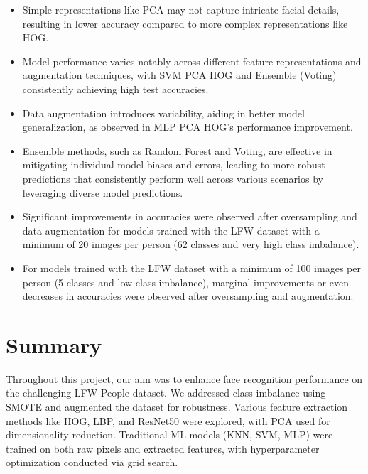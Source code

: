 \documentclass[a4paper]{article}
\theoremstyle{plain}
\theoremstyle{definition}
\begin{document}
\begin{itemize}

    \item Simple representations like PCA may not capture intricate facial details, resulting in lower accuracy compared to more complex representations like HOG.
    
    \item Model performance varies notably across different feature representations and augmentation techniques, with SVM PCA HOG and Ensemble (Voting) consistently achieving high test accuracies.
    
    \item Data augmentation introduces variability, aiding in better model generalization, as observed in MLP PCA HOG's performance improvement.
    
    \item Ensemble methods, such as Random Forest and Voting, are effective in mitigating individual model biases and errors, leading to more robust predictions that consistently perform well across various scenarios by leveraging diverse model predictions.
    
    \item Significant improvements in accuracies were observed after oversampling and data augmentation for models trained with the LFW dataset with a minimum of 20 images per person (62 classes and very high class imbalance).
    
    \item For models trained with the LFW dataset with a minimum of 100 images per person (5 classes and low class imbalance), marginal improvements or even decreases in accuracies were observed after oversampling and augmentation.
    
\end{itemize}

	\section{Summary}
	\label{sec:summ}

Throughout this project, our aim was to enhance face recognition performance on the challenging LFW People dataset. We addressed class imbalance using SMOTE and augmented the dataset for robustness. Various feature extraction methods like HOG, LBP, and ResNet50 were explored, with PCA used for dimensionality reduction. Traditional ML models (KNN, SVM, MLP) were trained on both raw pixels and extracted features, with hyperparameter optimization conducted via grid search.
\end{document}
